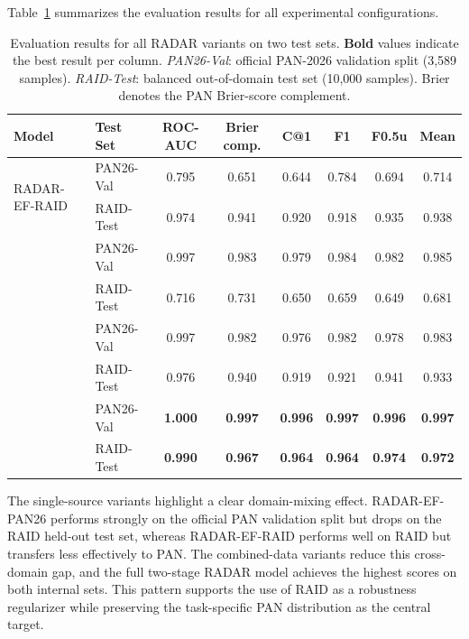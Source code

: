 \documentclass[]{ceurart}
\begin{document}
Table~\ref{tab:results} summarizes the evaluation results for all experimental
configurations.

\begin{table}[ht]
\centering
\caption{Evaluation results for all RADAR variants on two test sets.
  \textbf{Bold} values indicate the best result per column.
  \emph{PAN26-Val}: official PAN-2026 validation split (3,589 samples).
  \emph{RAID-Test}: balanced out-of-domain test set (10,000 samples). Brier
  denotes the PAN Brier-score complement.}
\label{tab:results}
\begingroup
\small
\setlength{\tabcolsep}{3pt}
\renewcommand{\arraystretch}{1.2}
\begin{tabular}{llcccccc}
\toprule
\textbf{Model} & \textbf{Test Set} & \textbf{ROC-AUC} & \textbf{Brier comp.}
  & \textbf{C@1} & \textbf{F1} & \textbf{F0.5u} & \textbf{Mean} \\
\midrule
\multirow{2}{*}{RADAR-EF-RAID}
  & PAN26-Val & 0.795 & 0.651 & 0.644 & 0.784 & 0.694 & 0.714 \\
  & RAID-Test  & 0.974 & 0.941 & 0.920 & 0.918 & 0.935 & 0.938 \\
\addlinespace
\multirow{2}{*}{RADAR-EF-PAN26}
  & PAN26-Val & 0.997 & 0.983 & 0.979 & 0.984 & 0.982 & 0.985 \\
  & RAID-Test  & 0.716 & 0.731 & 0.650 & 0.659 & 0.649 & 0.681 \\
\addlinespace
\multirow{2}{*}{RADAR-EF}
  & PAN26-Val & 0.997 & 0.982 & 0.976 & 0.982 & 0.978 & 0.983 \\
  & RAID-Test  & 0.976 & 0.940 & 0.919 & 0.921 & 0.941 & 0.933 \\
\addlinespace
\multirow{2}{*}{\textbf{RADAR}}
  & PAN26-Val & \textbf{1.000} & \textbf{0.997} & \textbf{0.996}
    & \textbf{0.997} & \textbf{0.996} & \textbf{0.997} \\
  & RAID-Test  & \textbf{0.990} & \textbf{0.967} & \textbf{0.964}
    & \textbf{0.964} & \textbf{0.974} & \textbf{0.972} \\
\bottomrule
\end{tabular}
\endgroup
\end{table}

The single-source variants highlight a clear domain-mixing effect. RADAR-EF-PAN26 performs strongly on the official PAN validation split but drops on the RAID held-out test set, whereas RADAR-EF-RAID performs well on RAID but transfers less effectively to PAN. The combined-data variants reduce this cross-domain gap, and the full two-stage RADAR model achieves the highest scores on both internal sets. This pattern supports the use of RAID as a robustness regularizer while preserving the task-specific PAN distribution as the central target.
\newline
\end{document}
